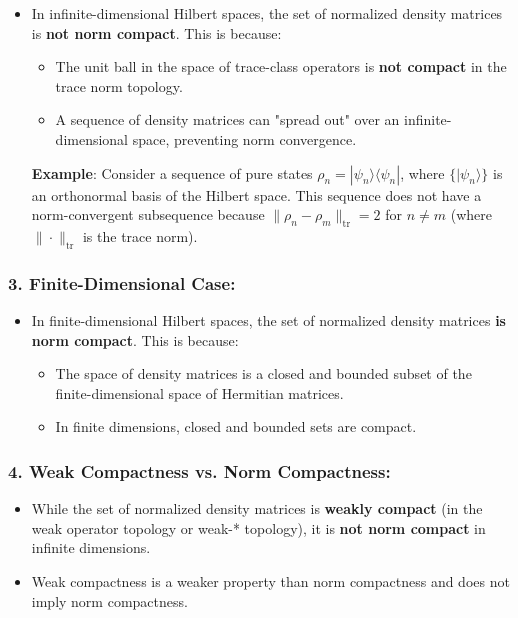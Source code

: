 \documentclass{article}
\begin{document}
\begin{itemize}
\item In infinite-dimensional Hilbert spaces, the set of normalized density
matrices is \textbf{not norm compact}. This is because: 

\begin{itemize}
\item The unit ball in the space of trace-class operators is \textbf{not
compact} in the trace norm topology. 

\item A sequence of density matrices can "spread out" over an
infinite-dimensional space, preventing norm convergence. 
\end{itemize}

\textbf{Example}:  Consider a sequence of pure states $\rho_n =
|\psi_n\rangle\langle\psi_n|$, where $\{|\psi_n\rangle\}$ is an orthonormal
basis of the Hilbert space. This sequence does not have a norm-convergent
subsequence because $\|\rho_n - \rho_m\|_{\text{tr}} = 2$ for $n \neq m$
(where $\|\cdot\|_{\text{tr}}$ is the trace norm).
\end{itemize}

\subsubsection*{3. \textbf{Finite-Dimensional Case}:}

\begin{itemize}
\item In finite-dimensional Hilbert spaces, the set of normalized density
matrices \textbf{is norm compact}. This is because: 

\begin{itemize}
\item The space of density matrices is a closed and bounded subset of the
finite-dimensional space of Hermitian matrices. 

\item In finite dimensions, closed and bounded sets are compact. 
\end{itemize}
\end{itemize}

\subsubsection*{4. \textbf{Weak Compactness vs. Norm Compactness}:}

\begin{itemize}
\item While the set of normalized density matrices is \textbf{weakly compact}
(in the weak operator topology or weak-* topology), it is \textbf{not norm
compact} in infinite dimensions. 

\item Weak compactness is a weaker property than norm compactness and does
not imply norm compactness.
\end{itemize}
\end{document}
